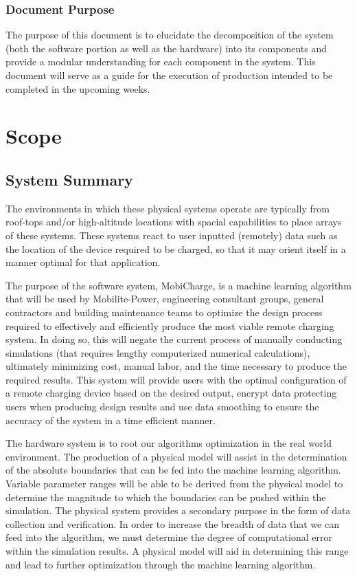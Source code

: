 \documentclass[12pt, titlepage]{article}
\begin{document}
\subsubsection{Document Purpose}
The purpose of this document is to elucidate the decomposition of the system (both the software portion as well as the hardware) into its components and provide a modular understanding for each component in the system. This document will serve as a guide for the execution of production intended to be completed in the upcoming weeks.


\section{Scope}
\subsection{System Summary}
\par
The environments in which these physical systems operate are typically from roof-tops and/or high-altitude locations with spacial capabilities to place arrays of these systems. These systems react to user inputted (remotely) data such as the location of the device required to be charged, so that it may orient itself in a manner optimal for that application. 
\par
The purpose of the software system, MobiCharge, is a machine learning algorithm that will be used by Mobilite-Power, engineering consultant groups, general contractors and building maintenance teams to optimize the design process required to effectively and efficiently produce the most viable remote charging system. In doing so, this will negate the current process of manually conducting simulations (that requires lengthy computerized numerical calculations), ultimately minimizing cost, manual labor, and the time necessary to produce the required results. This system will provide users with the optimal configuration of a remote charging device based on the desired output, encrypt data protecting users when producing design results and use data smoothing to ensure the accuracy of the system in a time efficient manner.
\par
The hardware system is to root our algorithms optimization in the real world environment. The production of a physical model will assist in the determination of the absolute boundaries that can be fed into the machine learning algorithm. Variable parameter ranges will be able to be derived from the physical model to determine the magnitude to which the boundaries can be pushed within the simulation. The physical system provides a secondary purpose in the form of data collection and verification. In order to increase the breadth of data that we can feed into the algorithm, we must determine the degree of computational error within the simulation results. A physical model will aid in determining this range and lead to further optimization through the machine learning algorithm.
\end{document}
